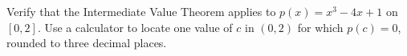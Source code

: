 \begin{questions}
\question[4] Verify that the Intermediate Value Theorem applies to
\(p(x)=x^3-4x+1\) on \([0,2]\). Use a calculator to locate one value of \(c\) in \((0,2)\) for which \(p(c)=0\), rounded to three decimal places.


\end{questions}

